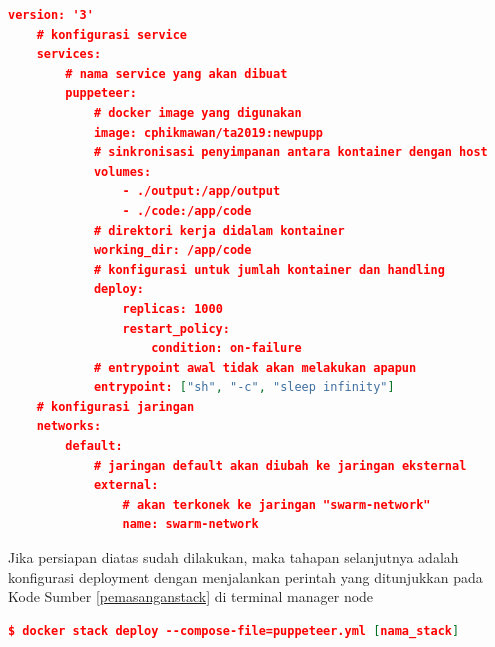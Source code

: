 			\begin{lstlisting}[frame=single,tabsize=2,breaklines,caption={Konfigurasi puppeteer.yml},label=puppyaml, captionpos=b, language=json]
	version: '3'
	# konfigurasi service
	services:
		# nama service yang akan dibuat
		puppeteer:
			# docker image yang digunakan
			image: cphikmawan/ta2019:newpupp
			# sinkronisasi penyimpanan antara kontainer dengan host
			volumes:
				- ./output:/app/output
				- ./code:/app/code
			# direktori kerja didalam kontainer
			working_dir: /app/code
			# konfigurasi untuk jumlah kontainer dan handling
			deploy:
				replicas: 1000
				restart_policy:
					condition: on-failure
			# entrypoint awal tidak akan melakukan apapun
			entrypoint: ["sh", "-c", "sleep infinity"]
	# konfigurasi jaringan
	networks:
		default:
			# jaringan default akan diubah ke jaringan eksternal
			external:
				# akan terkonek ke jaringan "swarm-network"
				name: swarm-network
			\end{lstlisting}
			
			\indent Jika persiapan diatas sudah dilakukan, maka tahapan selanjutnya adalah konfigurasi deployment dengan menjalankan perintah yang ditunjukkan pada Kode Sumber \ref{pemasanganstack} di terminal manager node
			\begin{lstlisting}[frame=single,tabsize=2,breaklines,caption={Perintah untuk pemasangan kontainer },label=pemasanganstack, captionpos=b, language=json,numbers=none]
	$ docker stack deploy --compose-file=puppeteer.yml [nama_stack]
			\end{lstlisting}
	
